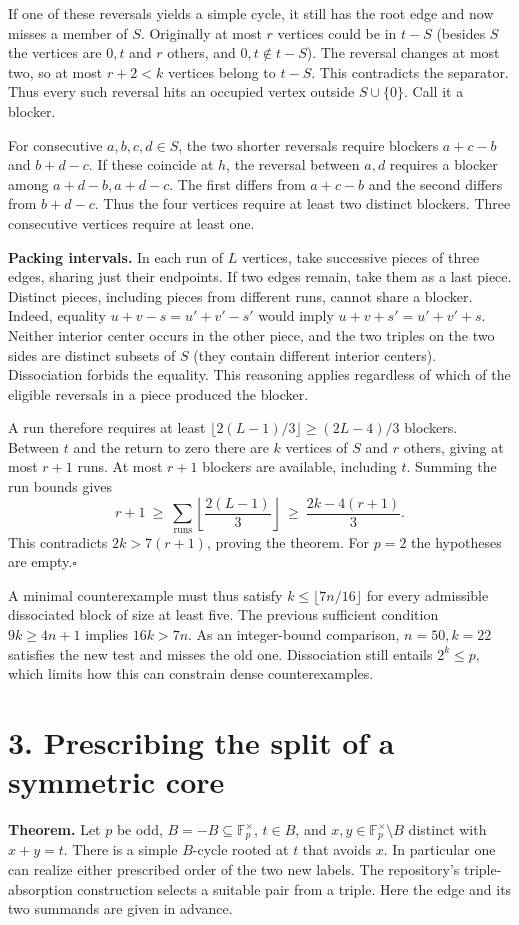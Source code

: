 \documentclass[11pt]{article}
\newcommand{\F}{\mathbb F_p}
\begin{document}
If one of these reversals yields a simple cycle, it still has the root edge and now misses a member of $S$. Originally at most $r$ vertices could be in $t-S$ (besides $S$ the vertices are $0,t$ and $r$ others, and $0,t\notin t-S$). The reversal changes at most two, so at most $r+2<k$ vertices belong to $t-S$. This contradicts the separator. Thus every such reversal hits an occupied vertex outside $S\cup\{0\}$. Call it a blocker.

For consecutive $a,b,c,d\in S$, the two shorter reversals require blockers $a+c-b$ and $b+d-c$. If these coincide at $h$, the reversal between $a,d$ requires a blocker among $a+d-b,a+d-c$. The first differs from $a+c-b$ and the second differs from $b+d-c$. Thus the four vertices require at least two distinct blockers. Three consecutive vertices require at least one.

\textbf{Packing intervals.} In each run of $L$ vertices, take successive pieces of three edges, sharing just their endpoints. If two edges remain, take them as a last piece. Distinct pieces, including pieces from different runs, cannot share a blocker. Indeed, equality $u+v-s=u'+v'-s'$ would imply $u+v+s'=u'+v'+s$. Neither interior center occurs in the other piece, and the two triples on the two sides are distinct subsets of $S$ (they contain different interior centers). Dissociation forbids the equality. This reasoning applies regardless of which of the eligible reversals in a piece produced the blocker.

A run therefore requires at least $\lfloor2(L-1)/3\rfloor\ge(2L-4)/3$ blockers. Between $t$ and the return to zero there are $k$ vertices of $S$ and $r$ others, giving at most $r+1$ runs. At most $r+1$ blockers are available, including $t$. Summing the run bounds gives
\[
 r+1\ \ge\ \sum_{\text{runs}}\left\lfloor\frac{2(L-1)}3\right\rfloor
 \ \ge\ \frac{2k-4(r+1)}3.
\]
This contradicts $2k>7(r+1)$, proving the theorem. For $p=2$ the hypotheses are empty.\hfill$\square$

A minimal counterexample must thus satisfy $k\le\lfloor 7n/16\rfloor$ for every admissible dissociated block of size at least five. The previous sufficient condition $9k\ge4n+1$ implies $16k>7n$. As an integer-bound comparison, $n=50,k=22$ satisfies the new test and misses the old one. Dissociation still entails $2^k\le p$, which limits how this can constrain dense counterexamples.

\section*{3. Prescribing the split of a symmetric core}
\textbf{Theorem.} Let $p$ be odd, $B=-B\subseteq\F^\times$, $t\in B$, and $x,y\in\F^\times\setminus B$ distinct with $x+y=t$. There is a simple $B$-cycle rooted at $t$ that avoids $x$. In particular one can realize either prescribed order of the two new labels. The repository's triple-absorption construction selects a suitable pair from a triple. Here the edge and its two summands are given in advance.
\end{document}
